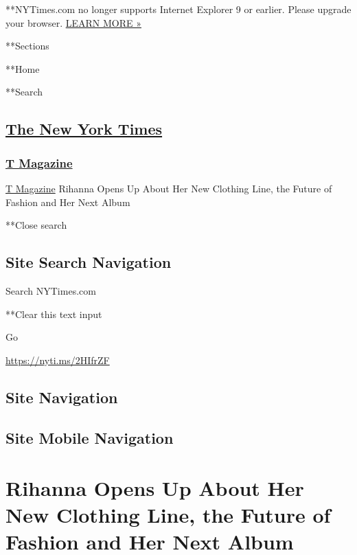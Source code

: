  **NYTimes.com no longer supports Internet Explorer 9 or earlier. Please
upgrade your browser.
\href{http://www.nytimes3xbfgragh.onion/content/help/site/ie9-support.html}{LEARN
MORE »}

**Sections

**Home

**Search

\hypertarget{the-new-york-times}{%
\subsection{\texorpdfstring{\href{http://www.nytimes3xbfgragh.onion/}{The
New York Times}}{The New York Times}}\label{the-new-york-times}}

\hypertarget{-t-magazine-}{%
\subsubsection{\texorpdfstring{
\href{https://www.nytimes3xbfgragh.onion/section/t-magazine}{T Magazine}
}{ T Magazine }}\label{-t-magazine-}}

 \href{https://www.nytimes3xbfgragh.onion/section/t-magazine}{T
Magazine} \textbar{}Rihanna Opens Up About Her New Clothing Line, the
Future of Fashion and Her Next Album

**Close search

\hypertarget{site-search-navigation}{%
\subsection{Site Search Navigation}\label{site-search-navigation}}

Search NYTimes.com

**Clear this text input

Go

\url{https://nyti.ms/2HIfrZF}

\hypertarget{site-navigation}{%
\subsection{Site Navigation}\label{site-navigation}}

\hypertarget{site-mobile-navigation}{%
\subsection{Site Mobile Navigation}\label{site-mobile-navigation}}

\hypertarget{rihanna-opens-up-about-her-new-clothing-line-the-future-of-fashion-and-her-next-album}{%
\section{Rihanna Opens Up About Her New Clothing Line, the Future of
Fashion and Her Next
Album}\label{rihanna-opens-up-about-her-new-clothing-line-the-future-of-fashion-and-her-next-album}}

